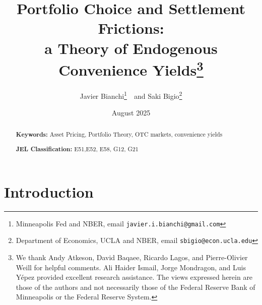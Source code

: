 \documentclass[12pt,american,english,notitlepage]{article}
\begin{document}
\title{\textbf{Portfolio Choice and Settlement Frictions: \\ a Theory of Endogenous Convenience Yields}\thanks{We thank Andy Atkeson, David Baqaee, Ricardo Lagos, and Pierre-Olivier Weill for helpful comments.
Ali Haider Ismail, Jorge Mondragon, and Luis Yépez provided excellent research assistance. The views expressed herein are those of the authors
and not necessarily those of the Federal Reserve Bank of Minneapolis
or the Federal Reserve System.}}
\author{Javier Bianchi\thanks{Minneapolis Fed and NBER, email \texttt{javier.i.bianchi@gmail.com}}
\,\ and Saki Bigio\thanks{Department of Economics, UCLA and NBER, email \texttt{sbigio@econ.ucla.edu}}}
\date{August 2025}
\maketitle
\begin{abstract} 

\bigskip{}
\noindent \textbf{Keywords:} Asset Pricing, Portfolio Theory, OTC
markets, convenience yields

\vspace{5pt}

 \noindent\textbf{ JEL Classification:} E51,E52, E58, G12, G21
\end{abstract}
\thispagestyle{empty}

\onehalfspacing

\newpage{}



\setcounter{page}{1}
\section{Introduction}
\end{document}
